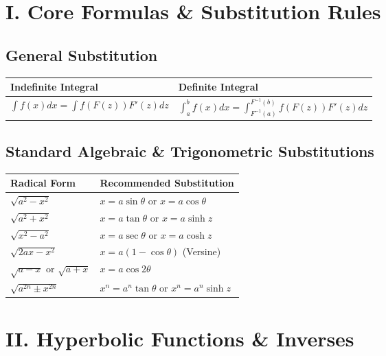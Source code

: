 \documentclass[11pt, a4paper]{article}
\begin{document}
\section*{\color{primary} I. Core Formulas \& Substitution Rules}

\subsection*{\color{secondary} General Substitution}
\begin{center}
\begin{tabular}{@{}p{} p{}@{}}
\toprule
\textbf{Indefinite Integral} & \textbf{Definite Integral} \\
\midrule
$\int f(x) dx = \int f(F(z)) F'(z) dz$ & $\int_a^b f(x) dx = \int_{F^{-1}(a)}^{F^{-1}(b)} f(F(z)) F'(z) dz$ \\
\bottomrule
\end{tabular}
\end{center}

\vspace{0.3cm}

\subsection*{\color{secondary} Standard Algebraic \& Trigonometric Substitutions}
\begin{center}
\begin{tabular}{@{}p{} p{}@{}}
\toprule
\textbf{Radical Form} & \textbf{Recommended Substitution} \\
\midrule
$\sqrt{a^2-x^2}$ & $x = a \sin \theta$ or $x = a \cos \theta$ \\
$\sqrt{a^2+x^2}$ & $x = a \tan \theta$ or $x = a \sinh z$ \\
$\sqrt{x^2-a^2}$ & $x = a \sec \theta$ or $x = a \cosh z$ \\
$\sqrt{2ax-x^2}$ & $x = a(1-\cos \theta)$ (Versine) \\
$\sqrt{a-x}$ or $\sqrt{a+x}$ & $x = a \cos 2\theta$ \\
$\sqrt{a^{2n} \pm x^{2n}}$ & $x^n = a^n \tan \theta$ or $x^n = a^n \sinh z$ \\
\bottomrule
\end{tabular}
\end{center}

\vspace{0.3cm}

\section*{\color{primary} II. Hyperbolic Functions \& Inverses}
\end{document}
